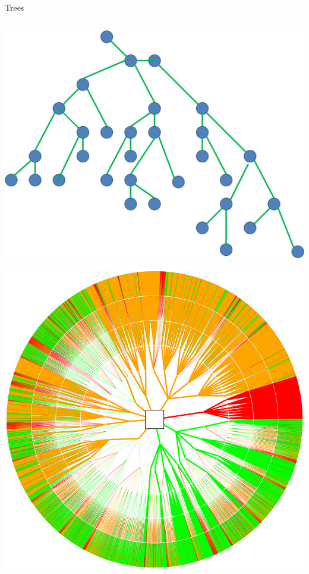 \begin{frame}{Trees}
	\begin{columns}
		\pause
		\begin{column}{0.3\textwidth}
			\includegraphics[width=\textwidth]{tree2}
			\par
			\vspace{2ex}
			\includegraphics[width=\textwidth]{tree}
		\end{column}

\end{columns}
\end{frame}
